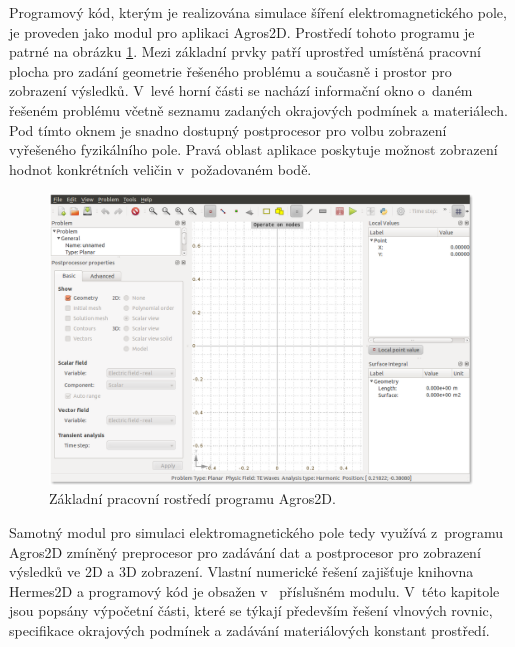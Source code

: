 Programový kód, kterým je realizována simulace šíření elektromagnetického pole, je proveden jako modul pro aplikaci Agros2D. Prostředí tohoto programu je patrné na obrázku \ref{obr:sim_agros2d}. Mezi základní prvky patří uprostřed umístěná pracovní plocha pro zadání geometrie řešeného problému a současně i prostor pro zobrazení výsledků. V~levé horní části se nachází informační okno o~daném řešeném problému včetně seznamu zadaných okrajových podmínek a materiálech. Pod tímto oknem je snadno dostupný postprocesor pro volbu zobrazení vyřešeného fyzikálního pole. Pravá oblast aplikace poskytuje možnost zobrazení hodnot konkrétních veličin v~požadovaném bodě.

\begin{figure}[!h]
	\centering
	\includegraphics[width=14cm]{sim_agros2d.png}
	\caption{Základní pracovní rostředí programu Agros2D.}
	\label{obr:sim_agros2d}
\end{figure}

Samotný modul pro simulaci elektromagnetického pole tedy využívá z~programu Agros2D zmíněný preprocesor pro zadávání dat a postprocesor pro zobrazení výsledků ve 2D a 3D zobrazení. Vlastní numerické řešení zajišťuje knihovna Hermes2D a programový kód je obsažen v~ příslušném modulu. V~této kapitole jsou popsány výpočetní části, které se týkají především řešení vlnových rovnic, specifikace okrajových podmínek a zadávání materiálových konstant prostředí. 

